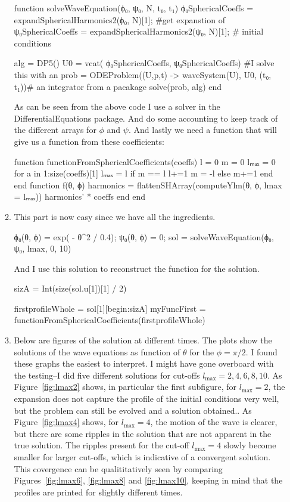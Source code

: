 \documentclass[12pt,a4]{article}
\begin{document}
\begin{enumerate}
\begin{enumerate}
\begin{jllisting}
function solveWaveEquation(ϕ₀, ψ₀, N, t₀, t₁)
  ϕ₀SphericalCoeffs = expandSphericalHarmonics2(ϕ₀, N)[1]; #get expanstion of
  ψ₀SphericalCoeffs = expandSphericalHarmonics2(ψ₀, N)[1]; # initial conditions

  alg = DP5()
  U0 = vcat( ϕ₀SphericalCoeffs, ψ₀SphericalCoeffs)         #I solve this with an
  prob = ODEProblem((U,p,t) -> waveSystem(U), U0, (t₀, t₁))# an integrator from a pacakage 
  solve(prob, alg)
end
\end{jllisting}
As can be seen from the above code I use a solver in the DifferentialEquations package.
And do some accounting to keep track of the different arrays for $\phi$ and $\psi$.
        And lastly we need a function that will give us a function from these coefficients: 
\begin{jllisting}
function functionFromSphericalCoefficients(coeffs)
  l = 0
  m = 0
  lₘₐₓ = 0
  for a in 1:size(coeffs)[1]
    lₘₐₓ = l
    if m == l
      l+=1
      m = -l
    else
      m+=1
    end
  end
  function f(θ, ϕ)
    harmonics = flattenSHArray(computeYlm(θ, ϕ, lmax = lₘₐₓ))
    harmonics' * coeffs
  end
end
\end{jllisting}
      \item
        This part is now easy since we have all the ingredients.
\begin{jllisting}
  ϕ₀(θ, ϕ) = exp( - θ^2 / 0.4);
  ψ₀(θ, ϕ) = 0;
  sol = solveWaveEquation(ϕ₀, ψ₀, lmax, 0, 10)
\end{jllisting}

And I use this solution to reconstruct the function for the solution.
\begin{jllisting}
sizA = Int(size(sol.u[1])[1] / 2)

firstprofileWhole = sol[1][begin:sizA]
myFuncFirst = functionFromSphericalCoefficients(firstprofileWhole)
\end{jllisting}

      \item
        Below are figures of the solution at different times. The plots show the solutions of the wave equations as function of $\theta$ for the $\phi = \pi / 2$.
        I found these graphs the easiest to interpret.
        I might have gone overboard with the testing--I did five different solutions for cut-offs $l_\text{max} = 2, 4, 6, 8, 10$.
        As Figure~\ref{fig:lmax2} shows, in particular the first subfigure, for $l_\text{max} = 2$, the expansion does not capture the profile of the initial conditions very well, but the problem can still be evolved and a solution obtained..
        As Figure~\ref{fig:lmax4} shows, for $l_\text{max} = 4$, the motion of the wave is clearer, but there are some ripples in the solution that are not apparent in the true solution. 
        The ripples present for the cut-off $l_\text{max} = 4$ slowly become smaller for larger cut-offs, which is indicative of a convergent solution.
        This covergence can be qualititatively seen by comparing Figures~\ref{fig:lmax6}, \ref{fig:lmax8} and \ref{fig:lmax10}, keeping in mind that the profiles are printed for slightly different times.


\end{enumerate}
\end{enumerate}
\end{document}
